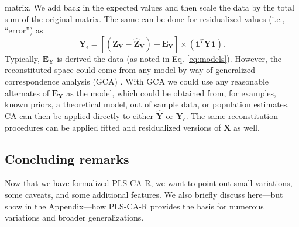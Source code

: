 \documentclass[12pt]{article}
\begin{document}
matrix. We add back in the expected values and then scale the data by
the total sum of the original matrix. The same can be done for
residualized values (i.e., ``error'') as \begin{equation}
{\mathbf Y}_{\epsilon} = [({\mathbf Z}_{\mathbf Y} - \widehat{{\mathbf Z}}_{\mathbf Y}) + {\mathbf E}_{\mathbf Y}] \times ({\mathbf 1}^{T}{\mathbf Y}{\mathbf 1}).
\label{eq:Yresid}
\end{equation} Typically, \({\mathbf E}_{\mathbf Y}\) is derived the
data (as noted in Eq. \ref{eq:models}). However, the reconstituted space
could come from any model by way of generalized correspondence analysis
(GCA)
\citep{escofier1983analyse, escofier1984analyse, grassi1994correspondence, beaton2018generalization}.
With GCA we could use any reasonable alternates of
\({\mathbf E}_{\mathbf Y}\) as the model, which could be obtained from,
for examples, known priors, a theoretical model, out of sample data, or
population estimates. CA can then be applied directly to either
\(\widehat{\mathbf Y}\) or \({\mathbf Y}_{\epsilon}\). The same
reconstitution procedures can be applied fitted and residualized
versions of \({\mathbf X}\) as well.

\hypertarget{concluding-remarks}{%
\subsection{Concluding remarks}\label{concluding-remarks}}

Now that we have formalized PLS-CA-R, we want to point out small
variations, some caveats, and some additional features. We also briefly
discuss here---but show in the Appendix---how PLS-CA-R provides the
basis for numerous variations and broader generalizations.
\end{document}
